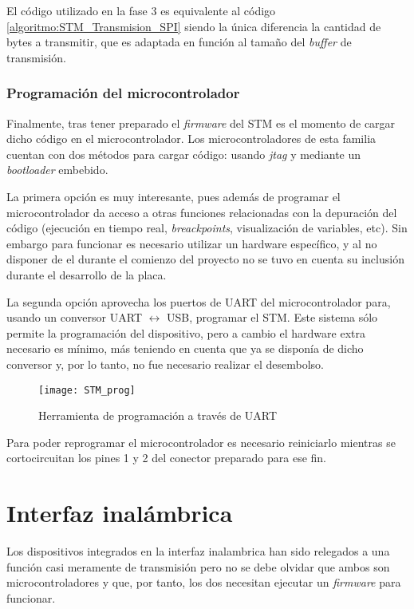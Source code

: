 El código utilizado en la fase 3 es equivalente al código \ref{algoritmo:STM_Transmision_SPI} siendo la única diferencia la cantidad de bytes a transmitir, que es adaptada en función al tamaño del \textit{buffer} de transmisión.

\subsubsection{Programación del microcontrolador\label{sec:Software_micro_ESP}}

Finalmente, tras tener preparado el \textit{firmware} del STM es el momento de cargar dicho código en el microcontrolador. Los microcontroladores de esta familia cuentan con dos métodos para cargar código: usando \textit{jtag} y mediante un \textit{bootloader} embebido.

La primera opción es muy interesante, pues además de programar el microcontrolador da acceso a otras funciones relacionadas con la depuración del código (ejecución en tiempo real, \textit{breackpoints}, visualización de variables, etc). Sin embargo para funcionar es necesario utilizar un hardware específico, y al no disponer de el durante el comienzo del proyecto no se tuvo en cuenta su inclusión durante el desarrollo de la placa.

La segunda opción aprovecha los puertos de UART del microcontrolador para, usando un conversor UART $\leftrightarrow$ USB, programar el STM. Este sistema sólo permite la programación del dispositivo, pero a cambio el hardware extra necesario es mínimo, más teniendo en cuenta que ya se disponía de dicho conversor y, por lo tanto, no fue necesario realizar el desembolso.

\begin{figure} [h]
    \centering
    \texttt{[image: STM\_prog]}
    \caption{Herramienta de programación a través de UART}
    \label{fig:STM_prog}
\end{figure}

Para poder reprogramar el microcontrolador es necesario reiniciarlo mientras se cortocircuitan los pines 1 y 2 del conector preparado para ese fin.

\clearpage

\section{Interfaz inalámbrica\label{sec:Software_inalambrica}}

Los dispositivos integrados en la interfaz inalambrica han sido relegados a una función casi meramente de transmisión pero no se debe olvidar que ambos son microcontroladores y que, por tanto, los dos necesitan ejecutar un \textit{firmware} para funcionar.

